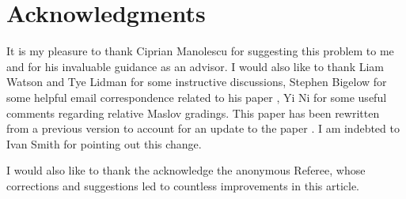 \documentclass[11pt]{article}
\theoremstyle{plain} \newtheorem{thm}{Theorem}[subsection]
\theoremstyle{plain} \newtheorem{cor}[thm]{Corollary}
\theoremstyle{plain} \newtheorem{prop}[thm]{Proposition}
\theoremstyle{plain} \newtheorem{conj}[thm]{Conjecture}
\theoremstyle{plain} \newtheorem{lem}[thm]{Lemma}
\theoremstyle{definition} \newtheorem{df}[thm]{Definition}
\theoremstyle{remark} \newtheorem{rmk}[thm]{Remark}
\theoremstyle{remark} \newtheorem{obs}[thm]{Observation}
\begin{document}
\section*{Acknowledgments}
It is my pleasure to thank Ciprian Manolescu for suggesting this problem to me and for his invaluable guidance as an advisor.  I would also like to thank Liam Watson and Tye Lidman for some instructive discussions, Stephen Bigelow for some helpful email correspondence related to his paper \cite{big:jones}, Yi Ni for some useful comments regarding relative Maslov gradings.  This paper has been rewritten from a previous version to account for an update to the paper \cite{ss:R2}.  I am indebted to Ivan Smith for pointing out this change.

I would also like to thank the acknowledge the anonymous Referee, whose corrections and suggestions led to countless improvements in this article.
\clearpage


\end{document}
